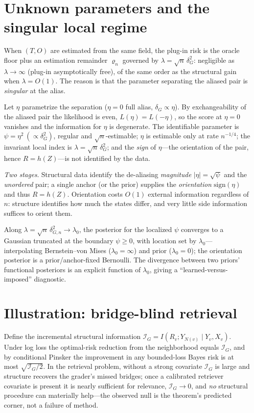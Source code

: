\documentclass[11pt]{article}
\theoremstyle{plain}
\theoremstyle{definition}\newtheorem{definition}{Definition}\newtheorem{assumption}{Assumption}
\begin{document}
\section{Unknown parameters and the singular local regime}\label{sec:singular}
When $(T,O)$ are estimated from the same field, the plug-in risk is the oracle floor plus an estimation remainder
$\varrho_n$ governed by $\lambda=\sqrt n\,\delta_G^2$: negligible as $\lambda\to\infty$ (plug-in asymptotically
free), of the same order as the structural gain when $\lambda=O(1)$. The reason is that the parameter separating
the aliased pair is \emph{singular} at the alias.
\begin{proposition}\label{prop:singular}
Let $\eta$ parametrize the separation ($\eta=0$ full alias, $\delta_G\propto\eta$). By exchangeability of the
aliased pair the likelihood is even, $L(\eta)=L(-\eta)$, so the score at $\eta=0$ vanishes and the information for
$\eta$ is degenerate. The identifiable parameter is $\psi=\eta^2\ (\propto\delta_G^2)$, regular and
$\sqrt n$-estimable; $\eta$ is estimable only at rate $n^{-1/4}$; the invariant local index is
$\lambda=\sqrt n\,\delta_G^2$; and the \emph{sign} of $\eta$---the orientation of the pair, hence $R=h(Z)$---is
not identified by the data.
\end{proposition}
\noindent \emph{Two stages.} Structural data identify the de-aliasing \emph{magnitude} $|\eta|=\sqrt\psi$ and the
\emph{unordered} pair; a single anchor (or the prior) supplies the \emph{orientation} $\mathrm{sign}(\eta)$ and
thus $R=h(Z)$. Orientation costs $O(1)$ external information regardless of $n$: structure identifies how much the
states differ, and very little side information suffices to orient them.
\begin{proposition}\label{prop:boundary}
Along $\lambda=\sqrt n\,\delta_{G,n}^2\to\lambda_0$, the posterior for the localized $\psi$ converges to a Gaussian
truncated at the boundary $\psi\ge0$, with location set by $\lambda_0$---interpolating Bernstein--von Mises
($\lambda_0=\infty$) and prior ($\lambda_0=0$); the orientation posterior is a prior/anchor-fixed Bernoulli. The
divergence between two priors' functional posteriors is an explicit function of $\lambda_0$, giving a
``learned-versus-imposed'' diagnostic.
\end{proposition}

\section{Illustration: bridge-blind retrieval}\label{sec:illus}
Define the incremental structural information $\mathcal I_G=I(R_v;Y_{N(v)}\mid Y_v,X_v)$. Under log loss the
optimal-risk reduction from the neighborhood equals $\mathcal I_G$, and by conditional Pinsker the improvement in
any bounded-loss Bayes risk is at most $\sqrt{\mathcal I_G/2}$. In the retrieval problem, without a strong
covariate $\mathcal I_G$ is large and structure recovers the grader's missed bridges; once a calibrated retriever
covariate is present it is nearly sufficient for relevance, $\mathcal I_G\!\to\!0$, and \emph{no} structural
procedure can materially help---the observed null is the theorem's predicted corner, not a failure of method.
\end{document}

